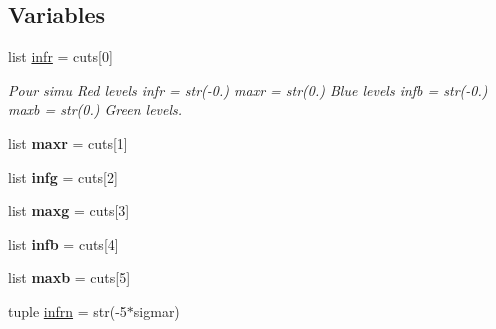 \subsection*{Variables}
\begin{DoxyCompactItemize}
\item 
list \hyperlink{namespace_m2_c_a_d_1_1colour__subtraction_a12bf426900d3a351c0c5800f0536aac4}{infr} = cuts\mbox{[}0\mbox{]}
\begin{DoxyCompactList}\small\item\em Pour simu Red levels infr = str(-\/0.) maxr = str(0.) Blue levels infb = str(-\/0.) maxb = str(0.) Green levels. \end{DoxyCompactList}\item 
\hypertarget{namespace_m2_c_a_d_1_1colour__subtraction_ac9e3ebd8a8d1402c94afa6cbe1cb2335}{}list {\bfseries maxr} = cuts\mbox{[}1\mbox{]}\label{namespace_m2_c_a_d_1_1colour__subtraction_ac9e3ebd8a8d1402c94afa6cbe1cb2335}

\item 
\hypertarget{namespace_m2_c_a_d_1_1colour__subtraction_adc17ec6ee50335eadbd700b592ce86c6}{}list {\bfseries infg} = cuts\mbox{[}2\mbox{]}\label{namespace_m2_c_a_d_1_1colour__subtraction_adc17ec6ee50335eadbd700b592ce86c6}

\item 
\hypertarget{namespace_m2_c_a_d_1_1colour__subtraction_a201385dd1d0103c34687ace23cfb170f}{}list {\bfseries maxg} = cuts\mbox{[}3\mbox{]}\label{namespace_m2_c_a_d_1_1colour__subtraction_a201385dd1d0103c34687ace23cfb170f}

\item 
\hypertarget{namespace_m2_c_a_d_1_1colour__subtraction_a0502639b4b43aeb428b148517bf88961}{}list {\bfseries infb} = cuts\mbox{[}4\mbox{]}\label{namespace_m2_c_a_d_1_1colour__subtraction_a0502639b4b43aeb428b148517bf88961}

\item 
\hypertarget{namespace_m2_c_a_d_1_1colour__subtraction_a4a3bc7e2311006744a7e6a29a8a66026}{}list {\bfseries maxb} = cuts\mbox{[}5\mbox{]}\label{namespace_m2_c_a_d_1_1colour__subtraction_a4a3bc7e2311006744a7e6a29a8a66026}

\item 
\hypertarget{namespace_m2_c_a_d_1_1colour__subtraction_a04d4ff9d88d29cba7ef85c3b4f0f641a}{}tuple \hyperlink{namespace_m2_c_a_d_1_1colour__subtraction_a04d4ff9d88d29cba7ef85c3b4f0f641a}{infrn} = str(-\/5$\ast$sigmar)\label{namespace_m2_c_a_d_1_1colour__subtraction_a04d4ff9d88d29cba7ef85c3b4f0f641a}


\end{DoxyCompactItemize}
